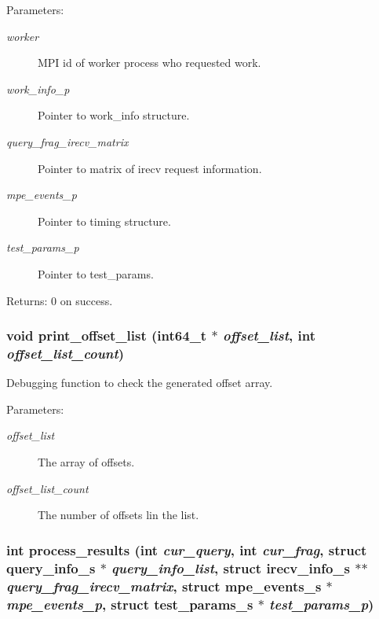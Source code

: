 \begin{Desc}
\item[Parameters:]
\begin{description}
\item[{\em worker}]MPI id of worker process who requested work. \item[{\em work\_\-info\_\-p}]Pointer to work\_\-info structure. \item[{\em query\_\-frag\_\-irecv\_\-matrix}]Pointer to matrix of irecv request information. \item[{\em mpe\_\-events\_\-p}]Pointer to timing structure. \item[{\em test\_\-params\_\-p}]Pointer to test\_\-params. \end{description}
\end{Desc}
\begin{Desc}
\item[Returns:]0 on success. \end{Desc}
\subsubsection{\setlength{\rightskip}{0pt plus 5cm}void print\_\-offset\_\-list (int64\_\-t $\ast$ {\em offset\_\-list}, int {\em offset\_\-list\_\-count})}\label{master__help_8c_37807c4b5a6db9d3a82df0915b9500d5}


Debugging function to check the generated offset array.

\begin{Desc}
\item[Parameters:]
\begin{description}
\item[{\em offset\_\-list}]The array of offsets. \item[{\em offset\_\-list\_\-count}]The number of offsets lin the list. \end{description}
\end{Desc}
\subsubsection{\setlength{\rightskip}{0pt plus 5cm}int process\_\-results (int {\em cur\_\-query}, int {\em cur\_\-frag}, struct \bf{query\_\-info\_\-s} $\ast$ {\em query\_\-info\_\-list}, struct \bf{irecv\_\-info\_\-s} $\ast$$\ast$ {\em query\_\-frag\_\-irecv\_\-matrix}, struct \bf{mpe\_\-events\_\-s} $\ast$ {\em mpe\_\-events\_\-p}, struct \bf{test\_\-params\_\-s} $\ast$ {\em test\_\-params\_\-p})}\label{master__help_8c_fb19fb09cef43dcdcb08fc990076133b}


